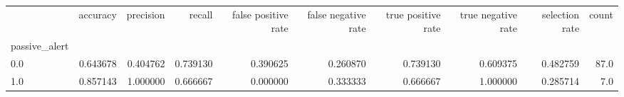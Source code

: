 \begin{tabular}{lrrrrrrrrr}
\toprule
{} &  accuracy &  precision &    recall &  false positive rate &  false negative rate &  true positive rate &  true negative rate &  selection rate &  count \\
passive\_alert &           &            &           &                      &                      &                     &                     &                 &        \\
\midrule
0.0           &  0.643678 &   0.404762 &  0.739130 &             0.390625 &             0.260870 &            0.739130 &            0.609375 &        0.482759 &   87.0 \\
1.0           &  0.857143 &   1.000000 &  0.666667 &             0.000000 &             0.333333 &            0.666667 &            1.000000 &        0.285714 &    7.0 \\
\bottomrule
\end{tabular}
